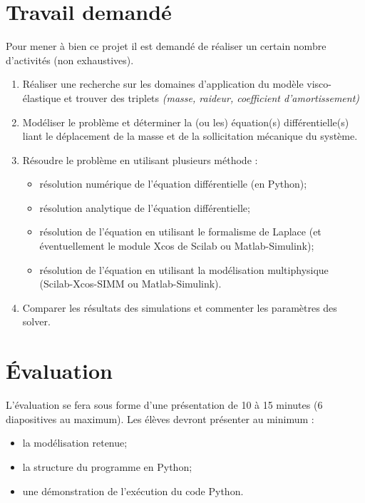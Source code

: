 \documentclass[10pt]{article}
\begin{document}
\begin{minipage}[c]{.77\linewidth}


\begin{obj}

\end{obj}
\end{minipage} \hfill
\begin{minipage}[c]{.2\linewidth}

\end{minipage}

\section{Travail demandé}
Pour mener à bien ce projet il est demandé de réaliser un certain nombre d'activités (non exhaustives).
\begin{enumerate}
\item Réaliser une recherche sur les domaines d'application du modèle visco-élastique et trouver des triplets \textit{(masse, raideur, coefficient d'amortissement)}
\item Modéliser le problème et déterminer la (ou les) équation(s) différentielle(s) liant le déplacement de la masse et de la sollicitation mécanique du système.
\item Résoudre le problème en utilisant plusieurs méthode : 
\begin{itemize}
\item résolution numérique de l'équation différentielle (en Python);
\item résolution analytique de l'équation différentielle;
\item résolution de l'équation en utilisant le formalisme de Laplace (et éventuellement le module Xcos de Scilab ou Matlab-Simulink);
\item résolution de l'équation en utilisant la modélisation multiphysique (Scilab-Xcos-SIMM ou Matlab-Simulink).
\end{itemize}
\item Comparer les résultats des simulations et commenter les paramètres des solver.
\end{enumerate}

\section{Évaluation}
L'évaluation se fera sous forme d'une présentation de 10 à 15 minutes (6 diapositives au maximum). Les élèves devront présenter au minimum : 
\begin{itemize}
\item la modélisation retenue;
\item la structure du programme en Python;
\item une démonstration de l'exécution du code Python.
\end{itemize}
\end{document}
